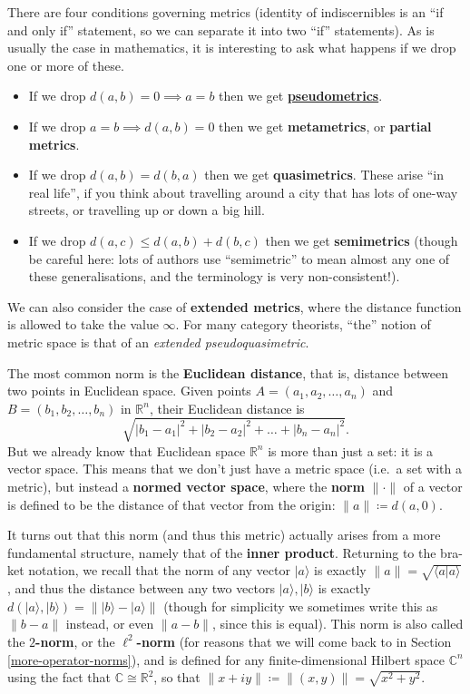 \documentclass[fleqn]{article}
\providecommand{\tightlist}{%
  \setlength{\itemsep}{0pt}\setlength{\parskip}{0pt}}
\newenvironment{technical}{\noindent}{\medskip}
\begin{document}
\begin{technical}
There are four conditions governing metrics (identity of indiscernibles is an ``if and only if'' statement, so we can separate it into two ``if'' statements).
As is usually the case in mathematics, it is interesting to ask what happens if we drop one or more of these.

\begin{itemize}
\tightlist
\item
  If we drop \(d(a,b)=0\implies a=b\) then we get \href{https://en.wikipedia.org/wiki/Pseudometric_space}{\textbf{pseudometrics}}.
\item
  If we drop \(a=b\implies d(a,b)=0\) then we get \textbf{metametrics}, or \textbf{partial metrics}.
\item
  If we drop \(d(a,b)=d(b,a)\) then we get \textbf{quasimetrics}. These arise ``in real life'', if you think about travelling around a city that has lots of one-way streets, or travelling up or down a big hill.
\item
  If we drop \(d(a,c)\leqslant d(a,b)+d(b,c)\) then we get \textbf{semimetrics} (though be careful here: lots of authors use ``semimetric'' to mean almost any one of these generalisations, and the terminology is very non-consistent!).
\end{itemize}

We can also consider the case of \textbf{extended metrics}, where the distance function is allowed to take the value \(\infty\).
For many category theorists, ``the'' notion of metric space is that of an \emph{extended pseudoquasimetric}.

\end{technical}

The most common norm is the \textbf{Euclidean distance}, that is, distance between two points in Euclidean space.
Given points \(A=(a_1,a_2,\ldots,a_n)\) and \(B=(b_1,b_2,\ldots,b_n)\) in \(\mathbb{R}^n\), their Euclidean distance is
\[
 \sqrt{|b_1-a_1|^2 + |b_2-a_2|^2+\ldots +|b_n-a_n|^2}.
\]
But we already know that Euclidean space \(\mathbb{R}^n\) is more than just a set: it is a vector space.
This means that we don't just have a metric space (i.e.~a set with a metric), but instead a \textbf{normed vector space}, where the \textbf{norm} \(\|\cdot\|\) of a vector is defined to be the distance of that vector from the origin: \(\|a\|\coloneqq d(a,0)\).

It turns out that this norm (and thus this metric) actually arises from a more fundamental structure, namely that of the \textbf{inner product}.
Returning to the bra-ket notation, we recall that the norm of any vector \(|a\rangle\) is exactly \(\|a\|=\sqrt{\langle a|a\rangle}\), and thus the distance between any two vectors \(|a\rangle,|b\rangle\) is exactly \(d(|a\rangle,|b\rangle)=\||b\rangle-|a\rangle\|\) (though for simplicity we sometimes write this as \(\|b-a\|\) instead, or even \(\|a-b\|\), since this is equal).
This norm is also called the \textbf{\(2\)-norm}, or the \textbf{\(\ell^2\)-norm} (for reasons that we will come back to in Section \ref{more-operator-norms}), and is defined for any finite-dimensional Hilbert space \(\mathbb{C}^n\) using the fact that \(\mathbb{C}\cong\mathbb{R}^2\), so that \(\|x+iy\|\coloneqq\|(x,y)\|=\sqrt{x^2+y^2}\).
\end{document}
